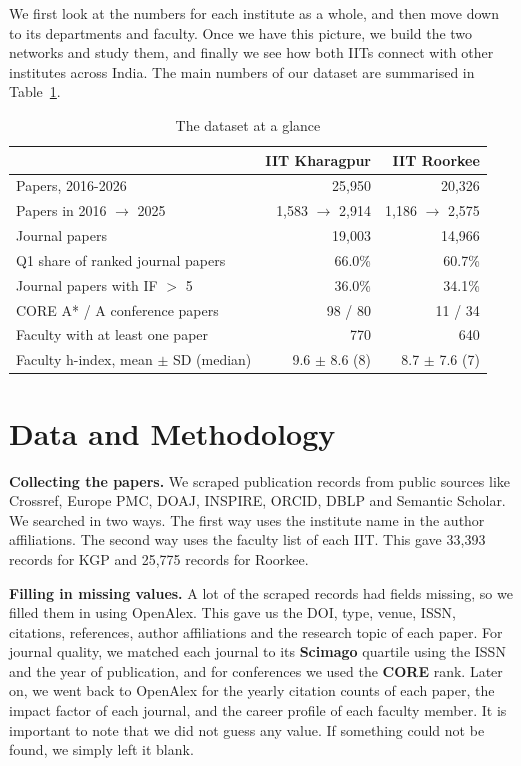 \documentclass[conference,10pt]{IEEEtran}
\begin{document}
We first look at the numbers for each institute as a whole, and then move down to its departments and faculty. Once we
have this picture, we build the two networks and study them, and finally we see how both IITs connect with other
institutes across India. The main numbers of our dataset are summarised in Table~\ref{tab:glance}.

\begin{table}[!h]
\centering
\caption{The dataset at a glance}
\label{tab:glance}
\footnotesize
\setlength{\tabcolsep}{4pt}
\begin{tabular}{@{}lrr@{}}
\toprule
 & \textbf{IIT Kharagpur} & \textbf{IIT Roorkee} \\
\midrule
Papers, 2016-2026                 & 25,950 & 20,326 \\
Papers in 2016 $\rightarrow$ 2025  & 1,583 $\rightarrow$ 2,914 & 1,186 $\rightarrow$ 2,575 \\
Journal papers                     & 19,003 & 14,966 \\
Q1 share of ranked journal papers  & 66.0\% & 60.7\% \\
Journal papers with IF $>$ 5       & 36.0\% & 34.1\% \\
CORE A* / A conference papers      & 98 / 80 & 11 / 34 \\
Faculty with at least one paper    & 770 & 640 \\
Faculty h-index, mean $\pm$ SD (median) & 9.6 $\pm$ 8.6 (8) & 8.7 $\pm$ 7.6 (7) \\
\bottomrule
\end{tabular}
\end{table}

\section{Data and Methodology}\label{sec:data}
\textbf{Collecting the papers.} We scraped publication records from public sources like Crossref, Europe PMC, DOAJ, INSPIRE, ORCID, DBLP and Semantic Scholar. We searched in two ways. The first way uses the institute name in the
author affiliations. The second way uses the faculty list of each IIT. This gave 33,393 records for KGP and 25,775
records for Roorkee.

\textbf{Filling in missing values.} A lot of the scraped records had fields missing, so we filled them in using
OpenAlex. This gave us the DOI, type, venue, ISSN, citations, references, author affiliations and the research topic
of each paper. For journal quality, we matched each journal to its \textbf{Scimago} quartile using the ISSN and the
year of publication, and for conferences we used the \textbf{CORE} rank. Later on, we went back to OpenAlex for the yearly citation counts of each paper, the impact factor of each journal, and the career profile of
each faculty member. It is important to note that we did not guess any value. If something could not be found, we
simply left it blank.
\end{document}
